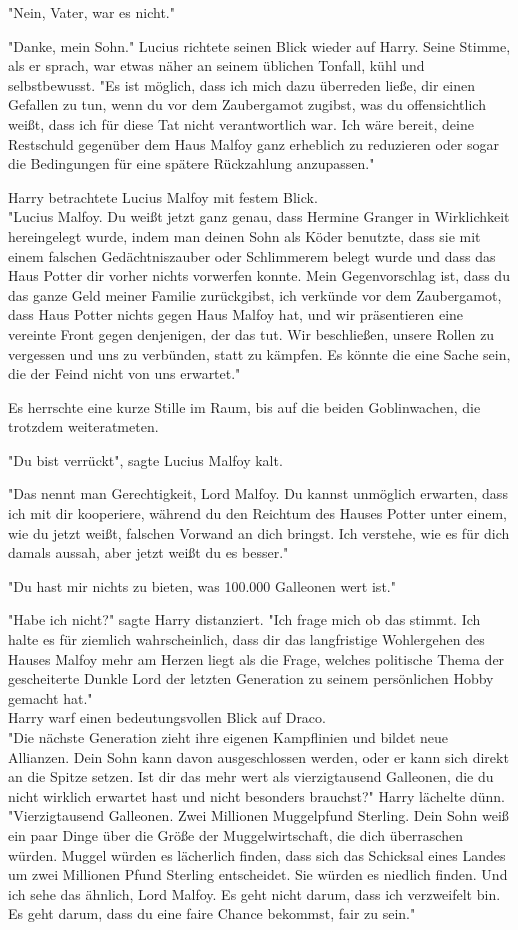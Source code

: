 {"Nein, Vater, war es nicht."

"Danke, mein Sohn." Lucius richtete seinen Blick wieder auf Harry. Seine Stimme, als er sprach, war etwas näher an seinem üblichen Tonfall, kühl und selbstbewusst. "Es ist möglich, dass ich mich dazu überreden ließe, dir einen Gefallen zu tun, wenn du vor dem Zaubergamot zugibst, was du offensichtlich weißt, dass ich für diese Tat nicht verantwortlich war. Ich wäre bereit, deine Restschuld gegenüber dem Haus Malfoy ganz erheblich zu reduzieren oder sogar die Bedingungen für eine spätere Rückzahlung anzupassen."

Harry betrachtete Lucius Malfoy mit festem Blick.\\ "Lucius Malfoy. Du weißt jetzt ganz genau, dass Hermine Granger in Wirklichkeit hereingelegt wurde, indem man deinen Sohn als Köder benutzte, dass sie mit einem falschen Gedächtniszauber oder Schlimmerem belegt wurde und dass das Haus Potter dir vorher nichts vorwerfen konnte. Mein Gegenvorschlag ist, dass du das ganze Geld meiner Familie zurückgibst, ich verkünde vor dem Zaubergamot, dass Haus Potter nichts gegen Haus Malfoy hat, und wir präsentieren eine vereinte Front gegen denjenigen, der das tut. Wir beschließen, unsere Rollen zu vergessen und uns zu verbünden, statt zu kämpfen. Es könnte die eine Sache sein, die der Feind nicht von uns erwartet."

Es herrschte eine kurze Stille im Raum, bis auf die beiden Goblinwachen, die trotzdem weiteratmeten.

"Du bist verrückt", sagte Lucius Malfoy kalt.

"Das nennt man Gerechtigkeit, Lord Malfoy. Du kannst unmöglich erwarten, dass ich mit dir kooperiere, während du den Reichtum des Hauses Potter unter einem, wie du jetzt weißt, falschen Vorwand an dich bringst. Ich verstehe, wie es für dich damals aussah, aber jetzt weißt du es besser."

"Du hast mir nichts zu bieten, was 100.000 Galleonen wert ist."

"Habe ich nicht?" sagte Harry distanziert. "Ich frage mich ob das stimmt. Ich halte es für ziemlich wahrscheinlich, dass dir das langfristige Wohlergehen des Hauses Malfoy mehr am Herzen liegt als die Frage, welches politische Thema der gescheiterte Dunkle Lord der letzten Generation zu seinem persönlichen Hobby gemacht hat."\\ Harry warf einen bedeutungsvollen Blick auf Draco.\\ "Die nächste Generation zieht ihre eigenen Kampflinien und bildet neue Allianzen. Dein Sohn kann davon ausgeschlossen werden, oder er kann sich direkt an die Spitze setzen. Ist dir das mehr wert als vierzigtausend Galleonen, die du nicht wirklich erwartet hast und nicht besonders brauchst?" Harry lächelte dünn. "Vierzigtausend Galleonen. Zwei Millionen Muggelpfund Sterling. Dein Sohn weiß ein paar Dinge über die Größe der Muggelwirtschaft, die dich überraschen würden. Muggel würden es lächerlich finden, dass sich das Schicksal eines Landes um zwei Millionen Pfund Sterling entscheidet. Sie würden es niedlich finden. Und ich sehe das ähnlich, Lord Malfoy. Es geht nicht darum, dass ich verzweifelt bin. Es geht darum, dass du eine faire Chance bekommst, fair zu sein."

}
